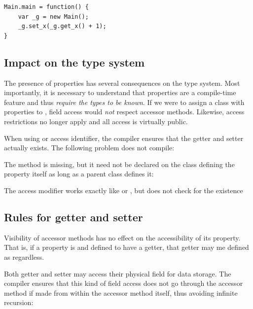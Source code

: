 \documentclass{haxe}
\begin{document}
\begin{lstlisting}
Main.main = function() {
	var _g = new Main();
	_g.set_x(_g.get_x() + 1);
}
\end{lstlisting}



\subsection{Impact on the type system}
\label{class-field-property-type-system-impact}

The presence of properties has several consequences on the type system. Most importantly, it is necessary to understand that properties are a compile-time feature and thus \emph{require the types to be known}. If we were to assign a class with properties to , field access would \emph{not} respect accessor methods. Likewise, access restrictions no longer apply and all access is virtually public.

When using  or  access identifier, the compiler ensures that the getter and setter actually exists. The following problem does not compile:


The method  is missing, but it need not be declared on the class defining the property itself as long as a parent class defines it:


The  access modifier works exactly like  or , but does not check for the existence



\subsection{Rules for getter and setter}
\label{class-field-property-rules}

Visibility of accessor methods has no effect on the accessibility of its property. That is, if a property is  and defined to have a getter, that getter may me defined as  regardless.

Both getter and setter may access their physical field for data storage. The compiler ensures that this kind of field access does not go through the accessor method if made from within the accessor method itself, thus avoiding infinite recursion:

\end{document}
